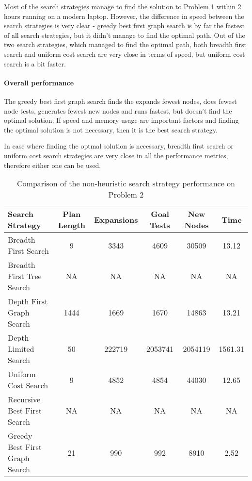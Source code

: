 \documentclass[11pt]{article}
\begin{document}
Most of the search strategies manage to find the solution to Problem 1 within 2 hours running on a modern laptop. However, the difference in speed between the search strategies is very clear - greedy best first graph search is by far the fastest of all search strategies, but it didn't manage to find the optimal path. Out of the two search strategies, which managed to find the optimal path, both breadth first search and uniform cost search are very close in terms of speed, but uniform cost search is a bit faster.

\paragraph{Overall performance}

The greedy best first graph search finds the expands fewest nodes, does fewest node tests, generates fewest new nodes and runs fastest, but doesn't find the optimal solution. If speed and memory usage are important factors and finding the optimal solution is not necessary, then it is the best search strategy.

In case where finding the optmal solution is necessary, breadth first search or uniform cost search strategies are very close in all the performance metrics, therefore either one can be used.

\begin{table}[H]
  \centering
  \caption{Comparison of the non-heuristic search strategy performance on Problem 2}
  \bigskip
  \label{table:nhp2}
  \bgroup
  \def\arraystretch{1.5}
  \begin{tabular}{l|c|c|c|c|c}
    Search Strategy & Plan Length & Expansions & Goal Tests & New Nodes & Time \\
    \hline
    Breadth First Search & 9 & 3343 & 4609 & 30509 & 13.12 \\
    Breadth First Tree Search & NA & NA & NA & NA & NA \\
    Depth First Graph Search & 1444 & 1669 & 1670 & 14863 & 13.21 \\
    Depth Limited Search & 50 & 222719 & 2053741 & 2054119 & 1561.31 \\
    Uniform Cost Search & 9 & 4852 & 4854 & 44030 & 12.65 \\
    Recursive Best First Search & NA & NA & NA & NA & NA \\
    Greedy Best First Graph Search & 21 & 990 & 992 & 8910 & 2.52
  \end{tabular}
  \egroup
\end{table}
\end{document}

